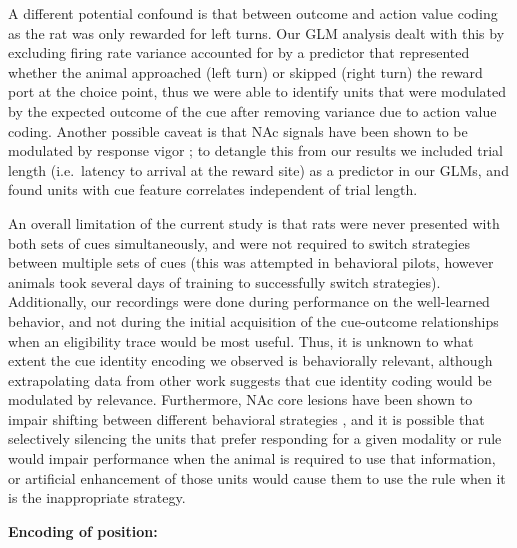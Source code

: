 \documentclass[11pt]{article}
\let\cite=\citep
\begin{document}
A different potential confound is that between outcome and action value coding as the rat was only rewarded for left turns. Our GLM analysis dealt with this by excluding firing rate variance accounted for by a predictor that represented whether the animal approached (left turn) or skipped (right turn) the reward port at the choice point, thus we were able to identify units that were modulated by the expected outcome of the cue after removing variance due to action value coding. Another possible caveat is that NAc signals have been shown to be modulated by response vigor \cite{McGinty2013}; to detangle this from our results we included trial length (i.e.\ latency to arrival at the reward site) as a predictor in our GLMs, and found units with cue feature correlates independent of trial length.

An overall limitation of the current study is that rats were never presented with both sets of cues simultaneously, and were not required to switch strategies between multiple sets of cues (this was attempted in behavioral pilots, however animals took several days of training to successfully switch strategies). Additionally, our recordings were done during performance on the well-learned behavior, and not during the initial acquisition of the cue-outcome relationships when an eligibility trace would be most useful. Thus, it is unknown to what extent the cue identity encoding we observed is behaviorally relevant, although extrapolating data from other work \cite{Sleezer2016} suggests that cue identity coding would be modulated by relevance. Furthermore, NAc core lesions have been shown to impair shifting between different behavioral strategies \cite{Floresco2006a}, and it is possible that selectively silencing the units that prefer responding for a given modality or rule would impair performance when the animal is required to use that information, or artificial enhancement of those units would cause them to use the rule when it is the inappropriate strategy.

{\bf Encoding of position:}
\end{document}
